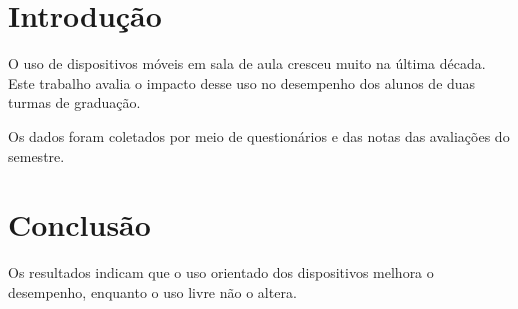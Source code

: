 \documentclass[11pt, a4paper]{article}
\begin{document}
\section{Introdução}

O uso de dispositivos móveis em sala de aula cresceu muito na última década. Este trabalho
avalia o impacto desse uso no desempenho dos alunos de duas turmas de graduação.

Os dados foram coletados por meio de questionários e das notas das avaliações do semestre.

\section{Conclusão}

Os resultados indicam que o uso orientado dos dispositivos melhora o desempenho, enquanto o uso
livre não o altera.
\end{document}
